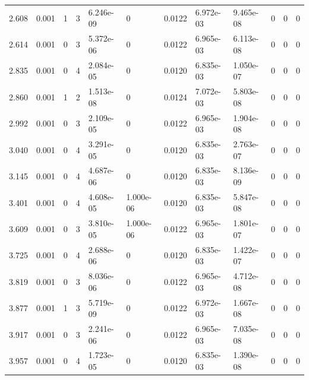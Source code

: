 \documentclass[preview]{standalone}
\begin{document}
{{\begin{tabular}{L{1.2cm}C{1.2cm} C{0.3cm}C{0.5cm} C{1.4cm}C{1.4cm} C{1.4cm}C{1.4cm} C{1.6cm}C{1.6cm} C{1.6cm}C{1.6cm}}
  2.608  &  0.001  & 1     &  3 &  6.246e-09  & 0  &  0.0122&   6.972e-03& 9.465e-08 & 0   &  0 & 0  \\ 
  2.614  &  0.001  & 0     &  3 &  5.372e-06  & 0  &  0.0122&   6.965e-03& 6.113e-08 & 0   &  0 & 0  \\ 
  2.835  &  0.001  & 0     &  4 &  2.084e-05  & 0  &  0.0120&   6.835e-03& 1.050e-07 & 0   &  0 & 0  \\ 
  2.860  &  0.001  & 1     &  2 &  1.513e-08  & 0  &  0.0124&   7.072e-03& 5.803e-08 & 0   &  0 & 0  \\ 
  2.992  &  0.001  & 0     &  3 &  2.109e-05  & 0  &  0.0122&   6.965e-03& 1.904e-08 & 0   &  0 & 0  \\ 
  3.040  &  0.001  & 0     &  4 &  3.291e-05  & 0  &  0.0120&   6.835e-03& 2.763e-07 & 0   &  0 & 0  \\ 
  3.145  &  0.001  & 0     &  4 &  4.687e-06  & 0  &  0.0120&   6.835e-03& 8.136e-09 & 0   &  0 & 0  \\ 
  3.401  &  0.001  & 0     &  4 &  4.608e-05  & 1.000e-06  &  0.0120&   6.835e-03& 5.847e-08 & 0   &  0 & 0  \\ 
  3.609  &  0.001  & 0     &  3 &  3.810e-05  & 1.000e-06  &  0.0122&   6.965e-03& 1.801e-07 & 0   &  0 & 0  \\ 
  3.725  &  0.001  & 0     &  4 &  2.688e-06  & 0  &  0.0120&   6.835e-03& 1.422e-07 & 0   &  0 & 0  \\ 
  3.819  &  0.001  & 0     &  3 &  8.036e-06  & 0  &  0.0122&   6.965e-03& 4.712e-08 & 0   &  0 & 0  \\ 
  3.877  &  0.001  & 1     &  3 &  5.719e-09  & 0  &  0.0122&   6.972e-03& 1.667e-08 & 0   &  0 & 0  \\ 
  3.917  &  0.001  & 0     &  3 &  2.241e-06  & 0  &  0.0122&   6.965e-03& 7.035e-08 & 0   &  0 & 0  \\ 
  3.957  &  0.001  & 0     &  4 &  1.723e-05  & 0  &  0.0120&   6.835e-03& 1.390e-08 & 0   &  0 & 0  \\ 
\hline 
\end{tabular} 

}}
\end{document}

